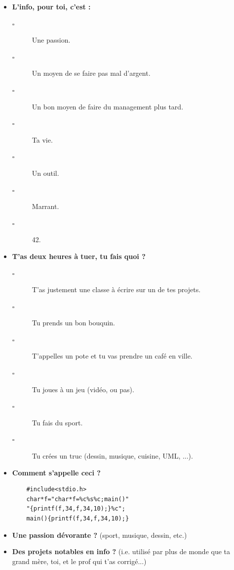 \begin{itemize}
    \item \textbf{L'info, pour toi, c'est :}
    \begin{description}
	\item[$\square$] Une passion.
	\item[$\square$] Un moyen de se faire pas mal d'argent.
	\item[$\square$] Un bon moyen de faire du management plus tard.
	\item[$\square$] Ta vie.
	\item[$\square$] Un outil.
	\item[$\square$] Marrant.
	\item[$\square$] 42.
    \end{description}
    \item \textbf{T'as deux heures à tuer, tu fais quoi ?}
    \begin{description}
	\item[$\square$] T'as justement une classe à écrire sur un de tes
	projets.
	\item[$\square$] Tu prends un bon bouquin.
	\item[$\square$] T'appelles un pote et tu vas prendre un café en ville.
	\item[$\square$] Tu joues à un jeu (vidéo, ou pas).
	\item[$\square$] Tu fais du sport.
	\item[$\square$] Tu crées un truc (dessin, musique, cuisine, UML, ...).
    \end{description}

    \item \textbf{Comment s'appelle ceci ?}
    \begin{verbatim}
	#include<stdio.h>
	char*f="char*f=%c%s%c;main()"
	"{printf(f,34,f,34,10);}%c";
	main(){printf(f,34,f,34,10);}
    \end{verbatim}
    \vspace{1cm}
    \item \textbf{Une passion dévorante ?} (sport, musique, dessin, etc.)
    \vspace{2cm}
    \item \textbf{Des projets notables en info ?} (i.e. utilisé par plus de monde que ta
	    grand mère, toi, et le prof qui t'as corrigé...)
    \vspace{2cm}
\end{itemize}
